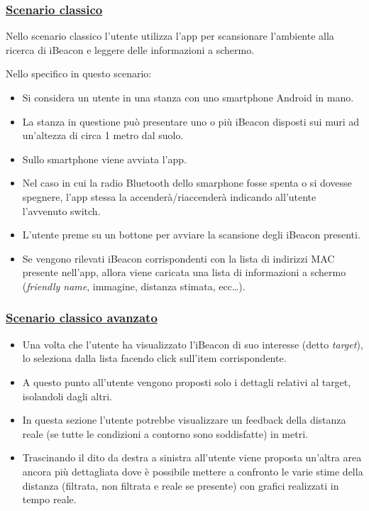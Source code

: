 \subsubsection{\underline{Scenario classico}}
Nello scenario classico l'utente utilizza l'app per scansionare l'ambiente alla ricerca di iBeacon e leggere delle informazioni a schermo.

Nello specifico in questo scenario:
\begin{itemize}
	\item Si considera un utente in una stanza con uno smartphone Android in mano.
	
	\item La stanza in questione può presentare uno o più iBeacon disposti sui muri ad un'altezza di circa 1 metro dal suolo.
	
	\item Sullo smartphone viene avviata l'app.
	
	\item Nel caso in cui la radio Bluetooth dello smarphone fosse spenta o si dovesse spegnere, l'app stessa la accenderà/riaccenderà indicando all'utente l'avvenuto switch.
	
	\item L'utente preme su un bottone per avviare la scansione degli iBeacon presenti.
	
	\item Se vengono rilevati iBeacon corrispondenti con la lista di indirizzi MAC presente nell'app, allora viene caricata una lista di informazioni a schermo (\textit{friendly name}, immagine, distanza stimata, ecc\dots).
\end{itemize}

\subsubsection{\underline{Scenario classico avanzato}}
\begin{itemize}
	\item Una volta che l'utente ha visualizzato l'iBeacon di suo interesse (detto \textit{target}), lo seleziona dalla lista facendo click sull'item corrispondente.
	
	\item A questo punto all'utente vengono proposti solo i dettagli relativi al target, isolandoli dagli altri.
	
	\item In questa sezione l'utente potrebbe visualizzare un feedback della distanza reale (se tutte le condizioni a contorno sono soddisfatte) in metri.
	
	\item Trascinando il dito da destra a sinistra all'utente viene proposta un'altra area ancora più dettagliata dove è possibile mettere a confronto le varie stime della distanza (filtrata, non filtrata e reale se presente) con grafici realizzati in tempo reale.
\end{itemize}
